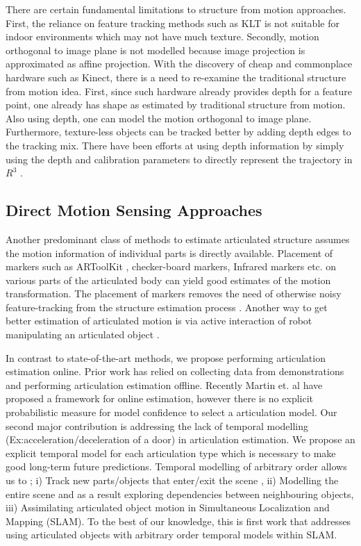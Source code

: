 \documentclass[conference]{IEEEtran}
\begin{document}
There are certain fundamental limitations to structure from motion approaches. First, the reliance on feature tracking methods such as KLT is not suitable for indoor environments which may not have much texture. Secondly, motion orthogonal to image plane is not modelled \cite{yan2006automatic} because image projection is approximated as affine projection. With the discovery of cheap and commonplace hardware such as Kinect, there is a need to re-examine the traditional structure from motion idea. First, since such hardware already provides depth for a feature point, one already has shape as estimated by traditional structure from motion. Also using depth, one can model the motion orthogonal to image plane. Furthermore, texture-less objects can be tracked better by adding depth edges to the tracking mix. There have been efforts at using depth information by simply using the depth and calibration parameters to directly represent the trajectory in $R^3$ \cite{Pillai-RSS-14,katz2013interactive}. 


\subsection{Direct Motion Sensing Approaches} Another predominant class of methods to estimate articulated structure assumes the motion information of individual parts is directly available. Placement of markers such as ARToolKit \cite{fiala2005comparing}, checker-board markers, Infrared markers etc. on various parts of the articulated body can yield good estimates of the motion transformation. The placement of markers removes the need of otherwise noisy feature-tracking from the structure estimation process \cite{gray2013single,sturm2011probabilistic,sturm2013learning,hausman2015active}. Another way to get better estimation of articulated motion is via active interaction of robot manipulating an articulated object \cite{katz2008extracting, hausman2015active}. 

In contrast to state-of-the-art methods, we propose performing articulation estimation online. Prior work has relied on collecting data from demonstrations and performing articulation estimation offline. Recently Martin et. al \cite{martin2014online} have proposed a framework for online estimation, however there is no explicit probabilistic measure for model confidence to select a articulation model. Our second major contribution is addressing the lack of temporal modelling (Ex:acceleration/deceleration of a door) in articulation estimation. We propose an explicit temporal model for each articulation type which is necessary to make good long-term future predictions. Temporal modelling of arbitrary order allows us to ; i) Track new parts/objects that enter/exit the scene \cite{martin2014online}, ii) Modelling the entire scene and as a result exploring dependencies between neighbouring objects, iii) Assimilating articulated object motion in Simultaneous Localization  and Mapping (SLAM). To the best of our knowledge, this is first work that addresses using articulated objects with arbitrary order temporal models within SLAM.
\end{document}
